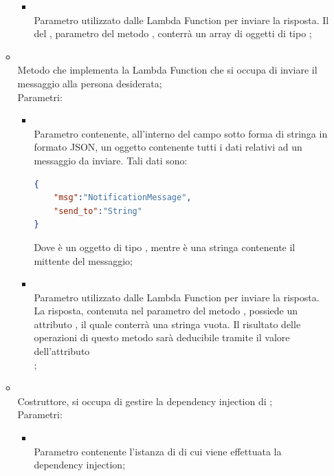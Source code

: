 \begin{itemize}
\begin{itemize}
\begin{itemize}
			\item {} \\
			Parametro utilizzato dalle Lambda Function per inviare la risposta. Il  del , parametro del metodo , conterrà un array di oggetti di tipo ;
		\end{itemize}
		\item[]  \\		Metodo che implementa la Lambda Function che si occupa di inviare il messaggio alla persona desiderata;\\
		Parametri:
		\begin{itemize}
			\item {} \\
			Parametro contenente, all'interno del campo  sotto forma di stringa in formato JSON, un oggetto contenente tutti i dati relativi ad un messaggio da inviare.
Tali dati sono:
\begin{lstlisting}[language=json,firstnumber=1]
{
    "msg":"NotificationMessage",
    "send_to":"String"
}
\end{lstlisting}
Dove  è un oggetto di tipo , mentre  è una stringa contenente il mittente del messaggio;
			\item {} \\
			Parametro utilizzato dalle Lambda Function per inviare la risposta. La risposta, contenuta nel  parametro del metodo , possiede un attributo , il quale conterrà una stringa vuota. Il risultato delle operazioni di questo metodo sarà deducibile tramite il valore dell'attributo \\ ;
		\end{itemize}
		\item[]  \\		Costruttore, si occupa di gestire la dependency injection di ;\\
		Parametri:
		\begin{itemize}
			\item {} \\
			Parametro contenente l'istanza di  di cui viene effettuata la dependency injection;

\end{itemize}
\end{itemize}
\end{itemize}
